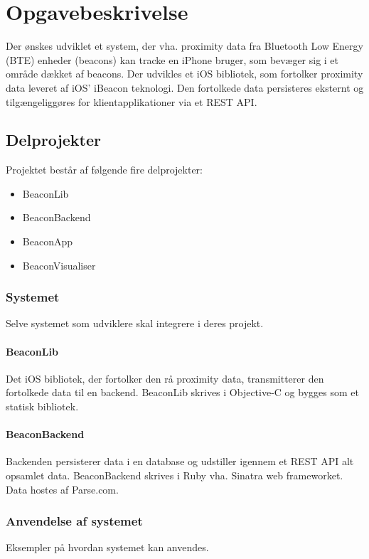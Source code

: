 \chapter{Opgavebeskrivelse}

Der ønskes udviklet et system, der vha. proximity data fra Bluetooth Low Energy (BTE) enheder (beacons) kan tracke en iPhone bruger, som bevæger sig i et område dækket af beacons. Der udvikles et iOS bibliotek, som fortolker proximity data leveret af iOS' iBeacon teknologi. Den fortolkede data persisteres eksternt og tilgængeliggøres for klientapplikationer via et REST API.

\section{Delprojekter}
Projektet består af følgende fire delprojekter:

\begin{itemize}
	\item BeaconLib
	\item BeaconBackend
	\item BeaconApp
	\item BeaconVisualiser
\end{itemize}

\subsection{Systemet}
Selve systemet som udviklere skal integrere i deres projekt.
\subsubsection{BeaconLib}
Det iOS bibliotek, der fortolker den rå proximity data, transmitterer den fortolkede data til en backend. BeaconLib skrives i Objective-C og bygges som et statisk bibliotek.

\subsubsection{BeaconBackend}
Backenden persisterer data i en database og udstiller igennem et REST API alt opsamlet data. BeaconBackend skrives i Ruby vha. Sinatra web frameworket. Data hostes af Parse.com.

\subsection{Anvendelse af systemet}
Eksempler på hvordan systemet kan anvendes.
